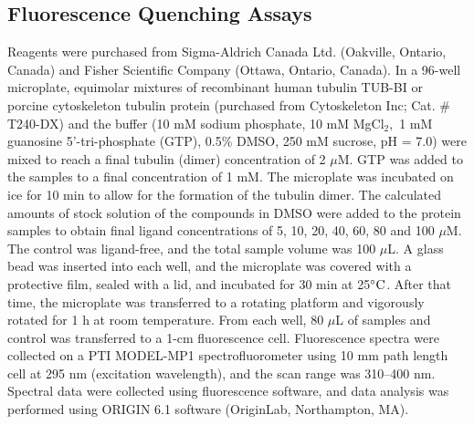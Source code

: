 \documentclass[11pt]{report}
\begin{document}
\subsection{Fluorescence Quenching Assays}
Reagents were purchased from Sigma-Aldrich Canada Ltd. (Oakville, Ontario, Canada) and Fisher Scientific Company (Ottawa, Ontario, Canada).
In a 96-well microplate, equimolar mixtures of recombinant human tubulin TUB-BI or porcine cytoskeleton tubulin protein 
(purchased from Cytoskeleton Inc; Cat. \# T240-DX)
and the buffer (10 mM sodium phosphate, 10 mM MgCl$_{2},$ 1 mM guanosine 5'-tri-phosphate (GTP), 0.5\% DMSO, 250 mM sucrose, pH = 7.0) were mixed to reach a final tubulin (dimer) concentration of 2 $\mu$M. GTP was added to the samples to a final concentration of 1 mM. The microplate was incubated on ice for 10 min to allow for the formation of the tubulin dimer. The calculated amounts of stock solution of the compounds in DMSO were added to the protein samples to obtain final ligand concentrations of 5, 10, 20, 40, 60, 80 and 100 $\mu$M. The control was ligand-free, and the total sample volume was 100 $\mu$L. A glass bead was inserted into each well, and the microplate was covered with a protective
film, sealed with a lid, and incubated for 30 min at 25$\celsius$. After that time, the microplate was transferred to a rotating platform and vigorously rotated for 1 h at room temperature. From each well, 80 $\mu$L of samples and control was transferred to a 1-cm fluorescence cell. Fluorescence spectra were collected on a PTI MODEL-MP1 spectrofluorometer using 10 mm path length cell at 295 nm (excitation wavelength), and the scan range was 310--400 nm. Spectral data were collected using fluorescence software, and data analysis was performed using ORIGIN 6.1 software (OriginLab, Northampton, MA).
\end{document}
